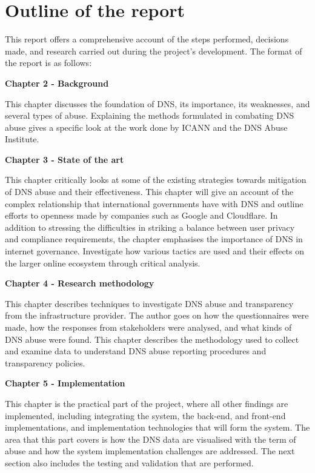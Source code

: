 \section{Outline of the report}

This report offers a comprehensive account of the steps performed, decisions made, and research carried out during the project's development. The format of the report is as follows:

\textbf{Chapter 2 - Background }

This chapter discusses the foundation of DNS, its importance, its weaknesses, and several types of abuse. Explaining the methods formulated in combating DNS abuse gives a specific look at the work done by ICANN and the DNS Abuse Institute.
\vspace{25px}

\textbf{Chapter 3 -  State of the art }

This chapter critically looks at some of the existing strategies towards mitigation of DNS abuse and their effectiveness. This chapter will give an account of the complex relationship that international governments have with DNS and outline efforts to openness made by companies such as Google and Cloudflare. In addition to stressing the difficulties in striking a balance between user privacy and compliance requirements, the chapter emphasises the importance of DNS in internet governance. Investigate how various tactics are used and their effects on the larger online ecosystem through critical analysis.

\textbf{Chapter 4 -  Research methodology }

This chapter describes techniques to investigate DNS abuse and transparency from the infrastructure provider. The author goes on how the questionnaires were made, how the responses from stakeholders were analysed, and what kinds of DNS abuse were found. This chapter describes the methodology used to collect and examine data to understand DNS abuse reporting procedures and transparency policies.

\textbf{Chapter 5 -  Implementation }

This chapter is the practical part of the project, where all other findings are implemented, including integrating the system, the back-end, and front-end implementations, and implementation technologies that will form the system. The area that this part covers is how the DNS data are visualised with the term of abuse and how the system implementation challenges are addressed. The next section also includes the testing and validation that are performed.

